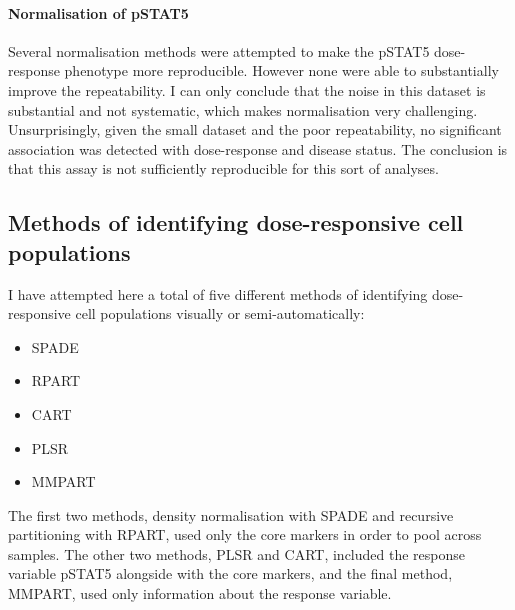 

\paragraph{Normalisation of pSTAT5}

Several normalisation methods were attempted to make the pSTAT5 dose-response phenotype more reproducible.
However none were able to substantially improve the repeatability.
I can only conclude that the noise in this dataset is substantial and not systematic, which makes normalisation very challenging.
Unsurprisingly, given the small dataset and the poor repeatability, no significant association was detected with dose-response
and disease status.
The conclusion is that this assay is not sufficiently reproducible for this sort of analyses.


\subsection{ Methods of identifying dose-responsive cell populations }

I have attempted here a total of five different methods of identifying dose-responsive cell populations visually or semi-automatically:
\begin{itemize}
    \item SPADE
    \item RPART
    \item CART
    \item PLSR
    \item MMPART
\end{itemize}
The first two methods, density normalisation with SPADE and recursive partitioning with RPART, used only the core markers in order to pool
across samples.
The other two methods, PLSR and CART, included the response variable pSTAT5 alongside with the core markers,
and the final method, MMPART, used only information about the response variable.

